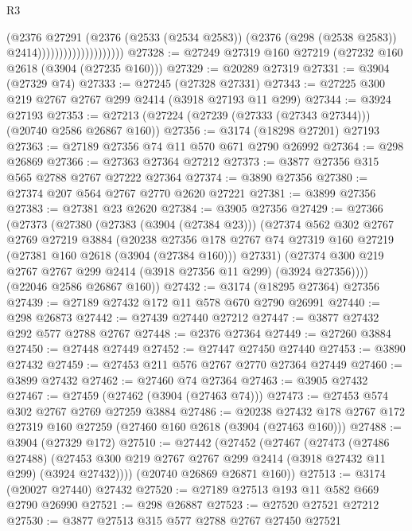 \begin{lexlean}{R3}
\begin{coremodule}
                                      (@2376
                                        @27291
                                        (@2376
                                          (@2533 (@2534 @2583))
                                          (@2376 (@298 (@2538 @2583)) @2414))))))))))))))))))))
@27328 := @27249 @27319 @160 @27219 (@27232 @160 @2618 (@3904 (@27235 @160)))
@27329 := @20289 @27319
@27331 := @3904 (@27329 @74)
@27333 := @27245 (@27328 @27331)
@27343 := @27225 @300 @219 @2767 @2767 @299 @2414 (@3918 @27193 @11 @299)
@27344 := @3924 @27193
@27353 := @27213 (@27224 (@27239 (@27333 (@27343 @27344))) (@20740 @2586 @26867 @160))
@27356 := @3174 (@18298 @27201) @27193
@27363 := @27189 @27356 @74 @11 @570 @671 @2790 @26992
@27364 := @298 @26869
@27366 := @27363 @27364 @27212
@27373 := @3877 @27356 @315 @565 @2788 @2767 @27222 @27364
@27374 := @3890 @27356
@27380 := @27374 @207 @564 @2767 @2770 @2620 @27221
@27381 := @3899 @27356
@27383 := @27381 @23 @2620
@27384 := @3905 @27356
@27429 := @27366
    (@27373
      (@27380
        (@27383 (@3904 (@27384 @23)))
        (@27374
          @562
          @302
          @2767
          @2769
          @27219
          @3884
          (@20238
            @27356
            @178
            @2767
            @74
            @27319
            @160
            @27219
            (@27381 @160 @2618 (@3904 (@27384 @160)))
            @27331)
          (@27374 @300 @219 @2767 @2767 @299 @2414 (@3918 @27356 @11 @299) (@3924 @27356))))
      (@22046 @2586 @26867 @160))
@27432 := @3174 (@18295 @27364) @27356
@27439 := @27189 @27432 @172 @11 @578 @670 @2790 @26991
@27440 := @298 @26873
@27442 := @27439 @27440 @27212
@27447 := @3877 @27432 @292 @577 @2788 @2767
@27448 := @2376 @27364
@27449 := @27260 @3884
@27450 := @27448 @27449
@27452 := @27447 @27450 @27440
@27453 := @3890 @27432
@27459 := @27453 @211 @576 @2767 @2770 @27364 @27449
@27460 := @3899 @27432
@27462 := @27460 @74 @27364
@27463 := @3905 @27432
@27467 := @27459 (@27462 (@3904 (@27463 @74)))
@27473 := @27453 @574 @302 @2767 @2769 @27259 @3884
@27486 := @20238 @27432 @178 @2767 @172 @27319 @160 @27259 (@27460 @160 @2618 (@3904 (@27463 @160)))
@27488 := @3904 (@27329 @172)
@27510 := @27442
    (@27452
      (@27467
        (@27473
          (@27486 @27488)
          (@27453 @300 @219 @2767 @2767 @299 @2414 (@3918 @27432 @11 @299) (@3924 @27432))))
      (@20740 @26869 @26871 @160))
@27513 := @3174 (@20027 @27440) @27432
@27520 := @27189 @27513 @193 @11 @582 @669 @2790 @26990
@27521 := @298 @26887
@27523 := @27520 @27521 @27212
@27530 := @3877 @27513 @315 @577 @2788 @2767 @27450 @27521

\end{coremodule}
\end{lexlean}
